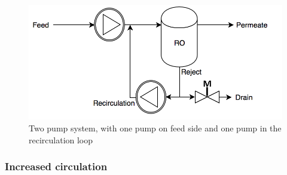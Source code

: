 \begin{figure}[H]
  \centering
  \includegraphics[width=1\linewidth]{Sys2}
  \caption{Two pump system, with one pump on feed side and one pump in the recirculation loop}
  \label{fig:System2_1}
\end{figure}


\newpage
\subsubsection{Increased circulation}

